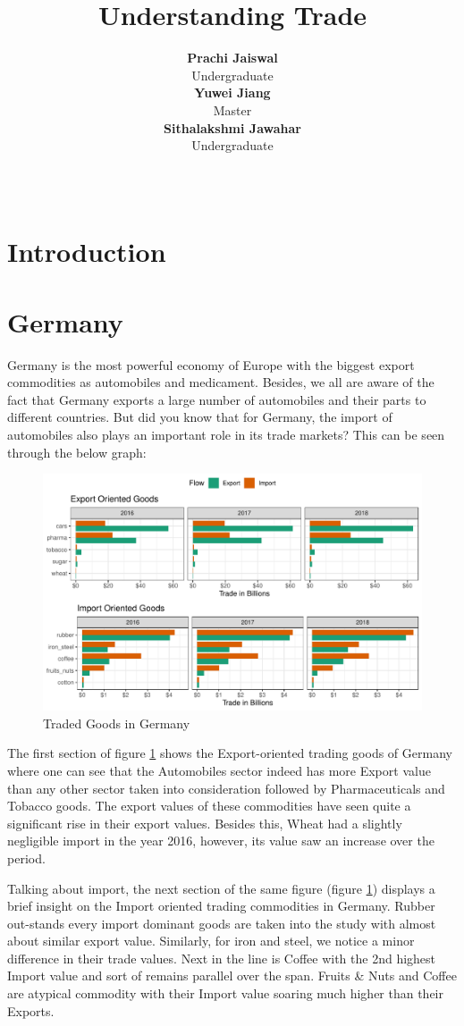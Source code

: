 \documentclass[11pt,a4paper,]{article}
\title{Understanding Trade}
\author{\sf\Large\textbf{ Prachi Jaiswal}\\ {\sf\large Undergraduate\\[0.5cm]} \sf\Large\textbf{ Yuwei Jiang}\\ {\sf\large Master\\[0.5cm]} \sf\Large\textbf{ Sithalakshmi Jawahar}\\ {\sf\large Undergraduate\\[0.5cm]}}
\date{\sf\Date~\Month~\Year}
\makeatletter
\def\titlepage{\front{\expandafter{\@title}}{\@author}{\@organization}}
\makeatother
\begin{document}
\titlepage

\section*{Introduction}

\section*{Germany}

Germany is the most powerful economy of Europe with the biggest export commodities as automobiles and medicament. Besides, we all are aware of the fact that Germany exports a large number of automobiles and their parts to different countries. But did you know that for Germany, the import of automobiles also plays an important role in its trade markets? This can be seen through the below graph:

\begin{figure}[H]
\includegraphics[width=1\linewidth,]{report_files/figure-latex/gtrade-1} \caption{Traded Goods in Germany}\label{fig:gtrade}
\end{figure}

The first section of figure \ref{fig:gtrade} shows the Export-oriented trading goods of Germany where one can see that the Automobiles sector indeed has more Export value than any other sector taken into consideration followed by Pharmaceuticals and Tobacco goods. The export values of these commodities have seen quite a significant rise in their export values. Besides this, Wheat had a slightly negligible import in the year 2016, however, its value saw an increase over the period.

Talking about import, the next section of the same figure (figure \ref{fig:gtrade}) displays a brief insight on the Import oriented trading commodities in Germany. Rubber out-stands every import dominant goods are taken into the study with almost about similar export value. Similarly, for iron and steel, we notice a minor difference in their trade values. Next in the line is Coffee with the 2nd highest Import value and sort of remains parallel over the span. Fruits \& Nuts and Coffee are atypical commodity with their Import value soaring much higher than their Exports.
\end{document}
